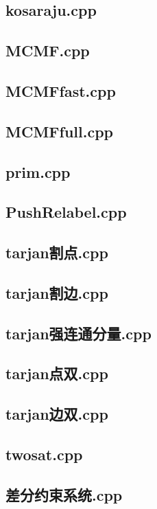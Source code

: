 \subsection{kosaraju.cpp}


\subsection{MCMF.cpp}


\subsection{MCMFfast.cpp}


\subsection{MCMFfull.cpp}


\subsection{prim.cpp}


\subsection{PushRelabel.cpp}


\subsection{tarjan割点.cpp}


\subsection{tarjan割边.cpp}


\subsection{tarjan强连通分量.cpp}


\subsection{tarjan点双.cpp}


\subsection{tarjan边双.cpp}


\subsection{twosat.cpp}


\subsection{差分约束系统.cpp}


